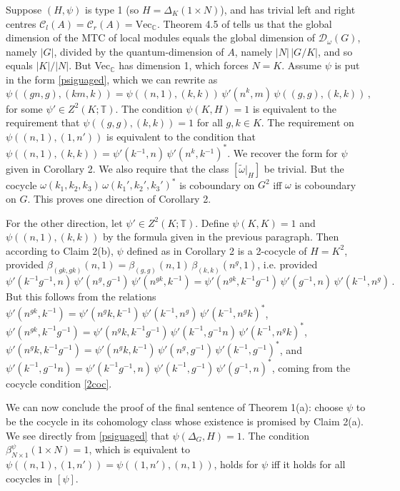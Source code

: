 \documentclass[12pt]{article}
\numberwithin{equation}{section}
\def\cC            {{\mathcal{C}}}
\def\cD            {{\mathcal{D}}}
\def\bbC           {\mathbb{C}}
\def\bbT           {\mathbb{T}}
\begin{document}
Suppose $(H,\psi)$ is type 1 (so $H=\Delta_K(1\times N)$), and has trivial left and right centres $\cC_l(A)=\cC_r(A)=\mathrm{Vec}_\bbC$.  Theorem 4.5 of \cite{KO} tells us that the global
dimension of the MTC of local modules equals the global dimension of $\cD_\omega(G)$, namely $|G|$, divided by the quantum-dimension of $A$, namely $|N|\,|G/K|$, and so equals $|K|/|N|$. But Vec$_\bbC$ has
dimension 1, which forces $N=K$.  
Assume $\psi$ is put in the form \eqref{psiguaged}, which we can rewrite as
\begin{equation} \psi((gn,g),(km,k))=\psi((n,1),(k,k))\,\psi'(n^k,m)\,\psi((g,g),(k,k))\,,\end{equation}
for some $\psi'\in Z^2(K;\bbT)$.
 The condition $\psi(K,H)=1$ is equivalent to the requirement that $\psi((g,g),(k,k))=1$ for all $g,k\in K$. The requirement on $\psi((n,1),(1,n'))$ is equivalent to the condition that $\psi((n,1),(k,k))=\psi'(k{}^{-1},n)\,
 \psi'(n^{k},k{}^{-1})^*$. We recover the form for $\psi$ given in Corollary 2. We also require that the class $[\widetilde{\omega}|_H]$ be trivial. But the cocycle $\omega(k_1,k_2,k_3)\,\omega(k_1',k_2',k_3')^*$
 is coboundary on $G^2$ iff $\omega$ is coboundary on $G$. This proves one direction of Corollary 2.
 
 For the other direction, let $\psi'\in Z^2(K;\bbT)$. Define $\psi(K,K)=1$ and $\psi((n,1),(k,k))$ by the formula given in the previous paragraph. Then according to Claim 2(b), $\psi$ defined as
 in Corollary 2 is a 2-cocycle of $H=K^2$, provided $\beta_{(gk,gk)}(n,1)=\beta_{(g,g)}(n,1)\,\beta_{(k,k)}(n^g,1)$, i.e. provided
 \begin{equation}\psi'(k^{-1}g^{-1},n)\,\psi'(n^g,g^{-1})\,\psi'(n^{gk},k^{-1})=\psi'(n^{gk},k^{-1}g^{-1})\,
 \psi'(g^{-1},n)\,\psi'(k^{-1},n^g)\,.\nonumber\end{equation}
 But this follows from the relations $\psi'(n^{gk},k^{-1})=\psi'(n^gk,k^{-1})\,\psi'(k^{-1},n^g)\,\psi'(k^{-1},n^gk)^*$, $\psi'(n^{gk},k^{-1}g^{-1})=\psi'(n^gk,k^{-1}g^{-1})\,\psi'(k^{-1},g^{-1}n)\,\psi'(k^{-1},n^gk)^*$, $\psi'(n^{g}k,k^{-1}g^{-1})=\psi'(n^gk,k^{-1})\,\psi'(n^g,g^{-1})\,\psi'(k^{-1},g^{-1})^*$, and
 $\psi'(k^{-1},g^{-1}n)=\psi'(k^{-1}g^{-1},n)\,\psi'(k^{-1},g^{-1})\,\psi'(g^{-1},n)^*$, coming from the cocycle condition \eqref{2coc}.
 
 We can now conclude the proof of the final  sentence of Theorem 1(a): choose $\psi$ to be the
  cocycle in its cohomology class whose existence is promised by Claim 2(a). We see directly from
 \eqref{psiguaged} that $\psi(\Delta_G,H)=1$. The condition $\beta^\psi_{N\times 1}(1\times N)=1$,
 which is equivalent to $\psi((n,1),(1,n'))=\psi((1,n'),(n,1))$, holds for $\psi$ iff it holds for all cocycles
 in $[\psi]$.
  
\end{document}
